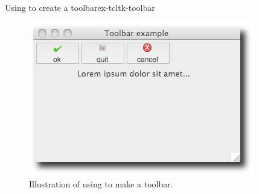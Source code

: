 \begin{example}{Using  to create a toolbar}{ex-tcltk-toolbar}
\begin{figure}
  \centering
  \includegraphics[width=.6\textwidth]{fig-tcltk-toolbar.png}
  \caption{Illustration of using  to make a toolbar. }
  \label{fig:fig-tcltk-toolbar}
\end{figure}

\end{example}

